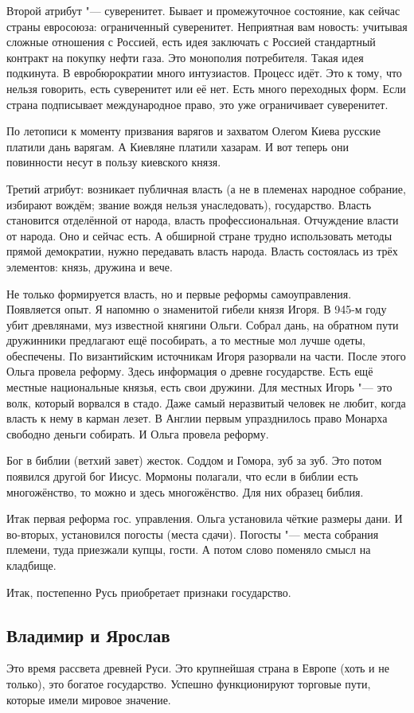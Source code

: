 Второй атрибут "--- суверенитет. Бывает и промежуточное состояние, как сейчас страны евросоюза: ограниченный суверенитет.
Неприятная вам новость: учитывая сложные отношения с Россией, есть идея заключать с Россией стандартный контракт на покупку нефти газа. Это монополия потребителя. Такая идея подкинута. В евробюрократии много интузиастов. Процесс идёт.
Это к тому, что нельзя говорить, есть суверенитет или её нет. Есть много переходных форм.
Если страна подписывает международное право, это уже ограничивает суверенитет.

По летописи к моменту призвания варягов и захватом Олегом Киева русские платили дань варягам. А Киевляне платили хазарам. И вот теперь они повинности несут в пользу киевского князя.

Третий атрибут: возникает публичная власть (а не в племенах народное собрание, избирают вождём; звание вождя нельзя унаследовать), государство. Власть становится отделённой от народа, власть профессиональная. Отчуждение власти от народа. Оно и сейчас есть. А обширной стране трудно использовать методы прямой демократии, нужно передавать власть народа. Власть состоялась из трёх элементов: князь, дружина и вече.

Не только формируется власть, но и первые реформы самоуправления. Появляется опыт. Я напомню о знаменитой гибели князя Игоря. В 945-м году убит древлянами, муз известной княгини Ольги. Собрал дань, на обратном пути дружинники предлагают ещё пособирать, а то местные мол лучше одеты, обеспечены.
По византийским источникам Игоря разорвали на части. После этого Ольга провела реформу. Здесь информация о древне государстве. Есть ещё местные национальные князья, есть свои дружини. Для местных Игорь "--- это волк, который ворвался в стадо. Даже самый неразвитый человек не любит, когда власть к нему в карман лезет.
В Англии первым упразднилось право Монарха свободно деньги собирать.
И Ольга провела реформу.

Бог в библии (ветхий завет) жесток. Соддом и Гомора, зуб за зуб. Это потом появился другой бог Иисус. Мормоны полагали, что если в библии есть многожёнство, то можно и здесь многожёнство. Для них образец библия.

Итак первая реформа гос. управления. Ольга установила чёткие размеры дани. И во-вторых, установился погосты (места сдачи). Погосты "--- места собрания племени, туда приезжали купцы, гости. А потом слово поменяло смысл на кладбище.

Итак, постепенно Русь приобретает признаки государство.
\subsection{Владимир и Ярослав}
Это время рассвета древней Руси. Это крупнейшая страна в Европе (хоть и не только), это богатое государство. Успешно функционируют торговые пути, которые имели мировое значение.

